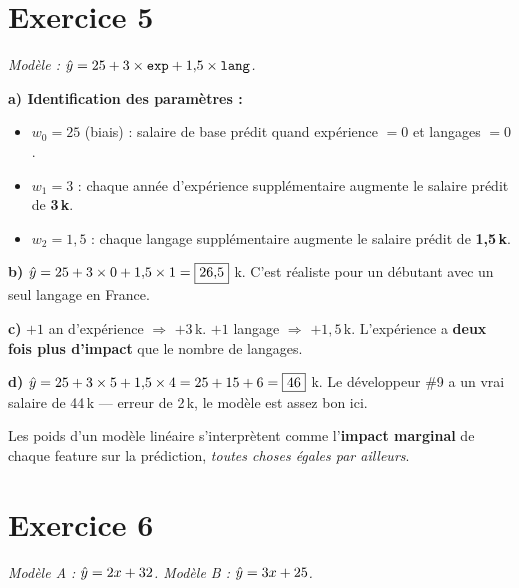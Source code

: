 \section*{Exercice 5 \hfill \exointermediaire}
\textit{Mod\`{e}le : $\hat{y} = 25 + 3 \times \texttt{exp} + 1{,}5 \times \texttt{lang}$.}

\separateur

\textbf{a) Identification des param\`{e}tres :}
\begin{itemize}
    \item $w_0 = 25$ (biais) : salaire de base pr\'{e}dit quand exp\'{e}rience $= 0$ et langages $= 0$.
    \item $w_1 = 3$ : chaque ann\'{e}e d'exp\'{e}rience suppl\'{e}mentaire augmente le salaire pr\'{e}dit de \textbf{3\,k\texteuro}.
    \item $w_2 = 1{,}5$ : chaque langage suppl\'{e}mentaire augmente le salaire pr\'{e}dit de \textbf{1,5\,k\texteuro}.
\end{itemize}

\textbf{b)} $\hat{y} = 25 + 3 \times 0 + 1{,}5 \times 1 = \boxed{26{,}5}$ k\texteuro.
C'est r\'{e}aliste pour un d\'{e}butant avec un seul langage en France.

\textbf{c)} $+1$ an d'exp\'{e}rience $\Rightarrow$ $+3$\,k\texteuro.
$+1$ langage $\Rightarrow$ $+1{,}5$\,k\texteuro.
L'exp\'{e}rience a \textbf{deux fois plus d'impact} que le nombre de langages.

\textbf{d)} $\hat{y} = 25 + 3 \times 5 + 1{,}5 \times 4 = 25 + 15 + 6 = \boxed{46}$ k\texteuro.
Le d\'{e}veloppeur \#9 a un vrai salaire de 44\,k\texteuro{} --- erreur de 2\,k\texteuro, le mod\`{e}le est assez bon ici.

\begin{retenirbox}
    Les poids d'un mod\`{e}le lin\'{e}aire s'interpr\`{e}tent comme l'\textbf{impact marginal}
    de chaque feature sur la pr\'{e}diction, \emph{toutes choses \'{e}gales par ailleurs}.
\end{retenirbox}

\section*{Exercice 6 \hfill \exointermediaire}
\textit{Mod\`{e}le A : $\hat{y} = 2x + 32$. Mod\`{e}le B : $\hat{y} = 3x + 25$.}

